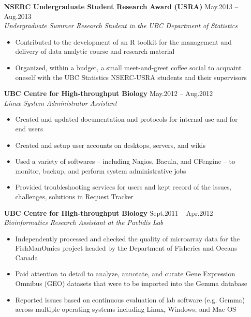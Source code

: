 \documentclass{res}
\newcommand{\linehead}[2]{%
  {\bf #1} \hfill #2\\}
\newcommand{\linetitle}[1]{%
  {\sl #1}}
\begin{document}
\begin{resume}
\linehead{NSERC Undergraduate Student Research Award (USRA)}{May.2013 -- Aug.2013}
\linetitle{Undergraduate Summer Research Student in the UBC Department of Statistics}
\begin{itemize}
  \item Contributed to the development of an R toolkit for the management and delivery of data analytic course and research material
  \item Organized, within a budget, a small meet-and-greet coffee social to acquaint oneself with the UBC Statistics NSERC-USRA students and their supervisors
\end{itemize}

\linehead{UBC Centre for High-throughput Biology}{May.2012 -- Aug.2012}
\linetitle{Linux System Administrator Assistant}
\begin{itemize}
  \item Created and updated documentation and protocols for internal use and for end users
  \item Created and setup user accounts on desktops, servers, and wikis
  \item Used a variety of softwares -- including Nagios, Bacula, and CFengine -- to monitor, backup, and perform system administrative jobs
  \item Provided troubleshooting services for users and kept record of the issues, challenges, solutions in Request Tracker
\end{itemize}

\linehead{UBC Centre for High-throughput Biology}{Sept.2011 -- Apr.2012}
\linetitle{Bioinformatics Research Assistant at the Pavlidis Lab}
\begin{itemize}
  \item Independently processed and checked the quality of microarray data for the FishManOmics project headed by the Department of Fisheries and Oceans Canada
  \item Paid attention to detail to analyze, annotate, and curate Gene Expression Omnibus (GEO) datasets that were to be imported into the Gemma database
  \item Reported issues based on continuous evaluation of lab software (e.g. Gemma) across multiple operating systems including Linux, Windows, and Mac OS
\end{itemize}



\end{resume}
\end{document}

